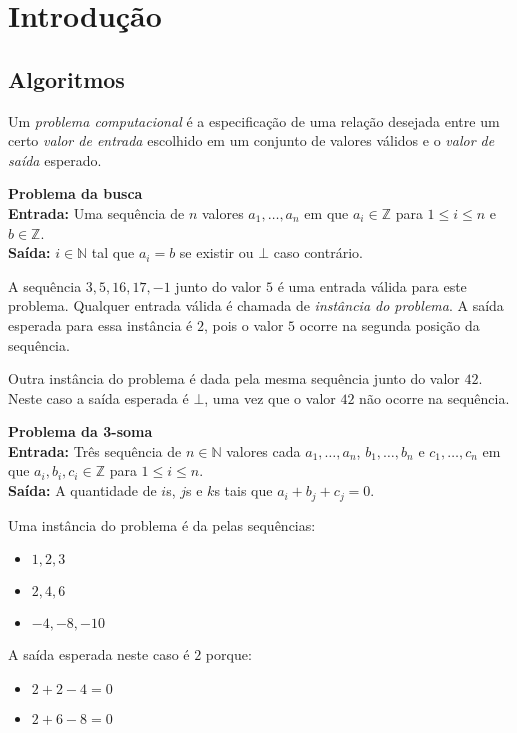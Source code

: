\chapter{Introdução}
\label{cha:intro}

\section{Algoritmos}

Um {\em problema computacional} é a especificação de uma relação desejada entre um certo {\em valor de entrada} escolhido em um conjunto de valores válidos e o {\em valor de saída} esperado.

\begin{example}
  {\bf Problema da busca}\\

  {\bf Entrada:} Uma sequência de $n$ valores $a_1, \dots, a_n$ em que $a_i \in \mathbb{Z}$ para $1 \leq i \leq n$ e $b \in \mathbb{Z}$.\\

  {\bf Saída:} $i \in \mathbb{N}$ tal que $a_i = b$ se existir ou $\bot$ caso contrário.


  A sequência $3, 5, 16, 17, -1$ junto do valor $5$ é uma entrada válida para este problema.
  Qualquer entrada válida é chamada de {\em instância do problema}.
  A saída esperada para essa instância é $2$, pois o valor $5$ ocorre na segunda posição da sequência.

  Outra instância do problema é dada pela mesma sequência junto do valor $42$.
  Neste caso a saída esperada é $\bot$, uma vez que o valor $42$ não ocorre na sequência.
\end{example}

\begin{example}
  {\bf Problema da 3-soma}\\

  {\bf Entrada:} Três sequência de $n \in \mathbb{N}$ valores cada $ a_1, \dots, a_n$,  $b_1, \dots, b_n$ e $c_1, \dots, c_n$ em que $a_i, b_i, c_i \in \mathbb{Z}$ para $1 \leq i \leq n$.\\

  {\bf Saída:} A quantidade de $i$s, $j$s e $k$s tais que $a_i + b_j + c_j = 0$.

  Uma instância do problema é da pelas sequências:
  \begin{itemize}
  \item[] $1, 2, 3$
  \item[] $2, 4, 6$
  \item[] $-4, -8, -10$
  \end{itemize}

  A saída esperada neste caso é $2$ porque:
  \begin{itemize}
  \item[] $2 + 2 - 4 = 0$
  \item[] $2 + 6 - 8 = 0$
  \end{itemize}
\end{example}

